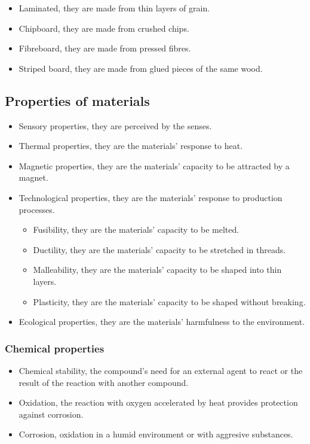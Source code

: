 \documentclass{article}
\begin{document}
\begin{itemize}
    \item Laminated, they are made from thin layers of grain.
    \item Chipboard, they are made from crushed chips.
    \item Fibreboard, they are made from pressed fibres.
    \item Striped board, they are made from glued pieces of the same wood.
\end{itemize}

\subsection*{Properties of materials}

\begin{itemize}
    \item Sensory properties, they are perceived by the senses.
    \item Thermal properties, they are the materials' response to heat.
    \item Magnetic properties, they are the materials' capacity to be attracted
    by a magnet.
    \item Technological properties, they are the materials' response to
    production processes.
    \begin{itemize}
        \item Fusibility, they are the materials' capacity to be melted.
        \item Ductility, they are the materials' capacity to be stretched in
        threads.
        \item Malleability, they are the materials' capacity to be shaped into
        thin layers.
        \item Plasticity, they are the materials' capacity to be shaped without
        breaking.
    \end{itemize}
    \item Ecological properties, they are the materials' harmfulness to the
    environment.
\end{itemize}

\subsubsection*{Chemical properties}

\begin{itemize}
    \item Chemical stability, the compound's need for an external agent to
    react or the result of the reaction with another compound.
    \item Oxidation, the reaction with oxygen accelerated by heat provides
    protection against corrosion.
    \item Corrosion, oxidation in a humid environment or with aggresive
    substances.
\end{itemize}
\end{document}
